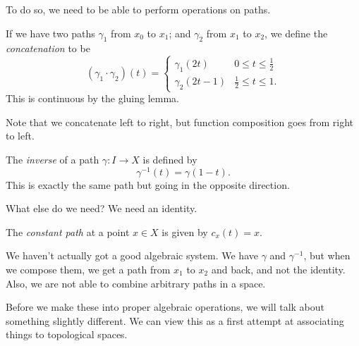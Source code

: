 \documentclass[a4paper]{article}
\begin{document}
To do so, we need to be able to perform operations on paths.
\begin{defi}
  If we have two paths $\gamma_1$ from $x_0$ to $x_1$; and $\gamma_2$ from $x_1$ to $x_2$, we define the \emph{concatenation} to be
  \[
    (\gamma_1\cdot \gamma_2)(t) =
    \begin{cases}
      \gamma_1(2t) & 0 \leq t \leq \frac{1}{2}\\
      \gamma_2(2t - 1) & \frac{1}{2} \leq t \leq 1.
    \end{cases}
  \]
  This is continuous by the gluing lemma.
\end{defi}
Note that we concatenate left to right, but function composition goes from right to left.
\begin{center}
\end{center}
\begin{defi}
  The \emph{inverse} of a path $\gamma: I \to X$ is defined by
  \[
    \gamma^{-1}(t) = \gamma(1 - t).
  \]
  This is exactly the same path but going in the opposite direction.
\end{defi}

What else do we need? We need an identity.
\begin{defi}
  The \emph{constant path} at a point $x\in X$ is given by $c_x(t) = x$.
\end{defi}

We haven't actually got a good algebraic system. We have $\gamma$ and $\gamma^{-1}$, but when we compose them, we get a path from $x_1$ to $x_2$ and back, and not the identity. Also, we are not able to combine arbitrary paths in a space.

Before we make these into proper algebraic operations, we will talk about something slightly different. We can view this as a first attempt at associating things to topological spaces.
\end{document}
